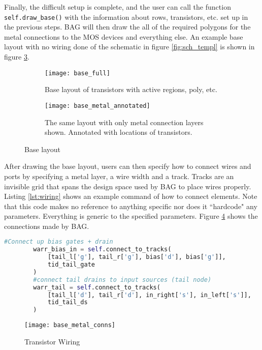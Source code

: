 \clearpage
Finally, the difficult setup is complete, and the user can call the function \texttt{self.draw\_base()} with the information about rows, transistors, etc. set up in the previous steps. BAG will then draw the all of the required polygons for the metal connections to the MOS devices and everything else. An example base layout with no wiring done of the schematic in figure \ref{fig:sch_templ} is shown in figure \ref{fig:base_layout_metal}.
\begin{figure}[h]
\centering
\begin{subfigure}{.4\linewidth}
  \centering
  \texttt{[image: base\_full]}
  \caption{Base layout of transistors with active regions, poly, etc.}
  \label{fig:sfig1}
\end{subfigure}
\begin{subfigure}{.4\linewidth}
  \centering
\texttt{[image: base\_metal\_annotated]}
  \caption{The same layout with only metal connection layers shown. Annotated with locations of transistors.}
  \label{fig:sfig2}
\end{subfigure}
\caption{Base layout}
\label{fig:base_layout_metal}
\end{figure}
\clearpage
After drawing the base layout, users can then specify how to connect wires and ports by specifying a metal layer, a wire width and a track. Tracks are an invisible grid that spans the design space used by BAG to place wires properly. Listing \ref{lst:wiring} shows an example command of how to connect elements. Note that this code makes no reference to anything specific nor does it ``hardcode" any parameters. Everything is generic to the specified parameters. Figure \ref{fig:base_with_wires} shows the connections made by BAG.
\begin{lstlisting}[language=Python, caption=Drawing wire connections, label={lst:wiring}, float]
	      #Connect up bias gates + drain
        warr_bias_in = self.connect_to_tracks(
            [tail_l['g'], tail_r['g'], bias['d'], bias['g']],
            tid_tail_gate
        )
        #connect tail drains to input sources (tail node)
        warr_tail = self.connect_to_tracks(
            [tail_l['d'], tail_r['d'], in_right['s'], in_left['s']],
            tid_tail_ds
        )
\end{lstlisting}
\begin{figure}[h]
\centering
\texttt{[image: base\_metal\_conns]}
\caption{Transistor Wiring}
\label{fig:base_with_wires}
\end{figure}

